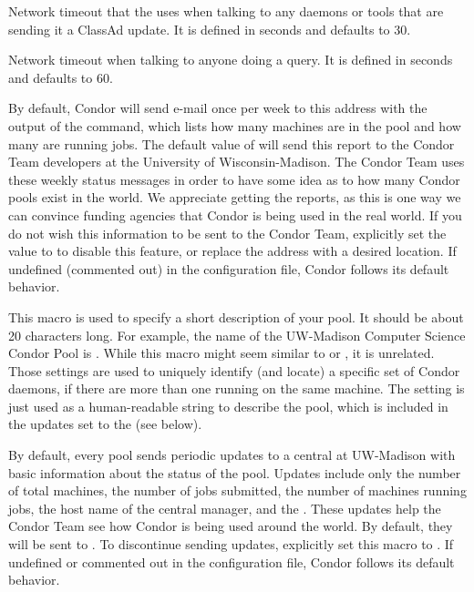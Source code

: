 \begin{description}
\label{param:ClientTimeout}
\item[\Macro{CLIENT\_TIMEOUT}]
  Network timeout that the  uses when talking to any daemons
  or tools that are sending it a ClassAd update.
  It is defined in seconds and defaults to 30.
  
\label{param:QueryTimeout}
\item[\Macro{QUERY\_TIMEOUT}]
  Network timeout when talking to anyone doing a query.
  It is defined in seconds and defaults to 60.
  
\label{param:CondorDevelopers}
\item[\Macro{CONDOR\_DEVELOPERS}]
  By default,
  Condor will send e-mail once per week to this address with the output
  of the  command, which lists how many machines
  are in the pool and how many are running jobs.  The default
  value of  will send this report to
  the Condor Team developers at the University of Wisconsin-Madison.
  The Condor Team uses
  these weekly status messages in order to have some idea as to how
  many Condor pools exist in the world.  We appreciate
  getting the reports, as this is one way we can convince funding
  agencies that Condor is being used in the real world.  
  If you do not wish this information to be sent to the Condor Team,
  explicitly set the value to  to disable this feature,
  or replace the
  address with a desired location.  
  If undefined (commented out) in the configuration file, Condor follows
  its default behavior.

\label{param:CollectorName}
\item[\Macro{COLLECTOR\_NAME}]
  This macro is used to specify a short description of your pool.
  It should be about 20 characters long.  For example, the name of the
  UW-Madison Computer Science Condor Pool is .  
  While this macro might seem similar to  or
  , it is unrelated.
  Those settings are used to uniquely identify (and locate) a specific
  set of Condor daemons, if there are more than one running on the same
  machine.
  The  setting is just used as a
  human-readable string to describe the pool, which is included in the
  updates set to the  (see
  below). 

\label{param:CondorDevelopersCollector}
\item[\Macro{CONDOR\_DEVELOPERS\_COLLECTOR}]
  By default, every pool sends
  periodic updates to a central  at UW-Madison with
  basic information about the status of the pool.  Updates include only
  the number of total machines, the number of jobs submitted, the
  number of machines running jobs, the host name of the central
  manager, and the .  These
  updates help the Condor Team see how Condor is being used around the world.
  By default, they will be sent to .
  To discontinue sending updates,
  explicitly set this macro to . 
  If undefined or commented out in the configuration file, Condor follows
  its default behavior.


\end{description}
